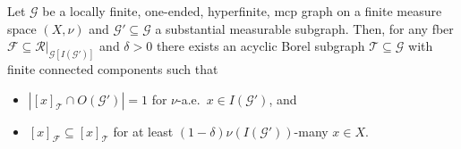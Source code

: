 \documentclass[10pt,a4paper]{amsart}
\begin{document}
\begin{lemma}\label{lem:technical}
    Let $\mathcal{G}$ be a locally finite, one-ended, hyperfinite, mcp graph on a finite measure space $(X,\nu)$ and $\mathcal{G}' \subseteq \mathcal{G}$ a substantial measurable subgraph. Then, for any fber $\mathcal{F} \subseteq \mathcal{R}|_{\mathcal G[I(\mathcal G')]}$ and $\delta > 0$ there exists an acyclic Borel subgraph $\mathcal{T} \subseteq \mathcal{G}$ with finite connected components such that 
    \begin{itemize}
        \item[i)] $|[x]_{\mathcal{T}} \cap O(\mathcal{G}')| = 1$ for $\nu$-a.e.\ $x\in I(\mathcal{G}')$, and
        \item[ii)] $[x]_\mathcal{F} \subseteq [x]_{\mathcal{T}}$ for at least $(1 - \delta) \nu (I(\mathcal{G}'))$-many $x\in X$.
    \end{itemize}
\end{lemma}
\end{document}
